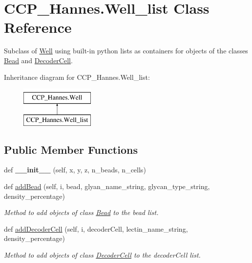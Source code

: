 \hypertarget{class_c_c_p___hannes_1_1_well__list}{}\section{C\+C\+P\+\_\+\+Hannes.\+Well\+\_\+list Class Reference}
\label{class_c_c_p___hannes_1_1_well__list}


Subclass of \mbox{\hyperlink{class_c_c_p___hannes_1_1_well}{Well}} using built-\/in python lists as containers for objects of the classes \mbox{\hyperlink{class_c_c_p___hannes_1_1_bead}{Bead}} and \mbox{\hyperlink{class_c_c_p___hannes_1_1_decoder_cell}{Decoder\+Cell}}.  


Inheritance diagram for C\+C\+P\+\_\+\+Hannes.\+Well\+\_\+list\+:\begin{figure}[H]
\begin{center}
\leavevmode
\includegraphics[height=2.000000cm]{class_c_c_p___hannes_1_1_well__list}
\end{center}
\end{figure}
\subsection*{Public Member Functions}
\begin{DoxyCompactItemize}
\item 
\mbox{\label{class_c_c_p___hannes_1_1_well__list_a933f4992003c4596f01e5d6eb073dd98}} 
def {\bfseries \+\_\+\+\_\+init\+\_\+\+\_\+} (self, x, y, z, n\+\_\+beads, n\+\_\+cells)
\item 
def \mbox{\hyperlink{class_c_c_p___hannes_1_1_well__list_ae4a512caba0dd7137b6ad4196cf72c1d}{add\+Bead}} (self, i, bead, glyan\+\_\+name\+\_\+string, glycan\+\_\+type\+\_\+string, density\+\_\+percentage)
\begin{DoxyCompactList}\small\item\em Method to add objects of class \mbox{\hyperlink{class_c_c_p___hannes_1_1_bead}{Bead}} to the bead list. \end{DoxyCompactList}\item 
def \mbox{\hyperlink{class_c_c_p___hannes_1_1_well__list_a761bc7b91f29dd64b96992fa33d24259}{add\+Decoder\+Cell}} (self, i, decoder\+Cell, lectin\+\_\+name\+\_\+string, density\+\_\+percentage)
\begin{DoxyCompactList}\small\item\em Method to add objects of class \mbox{\hyperlink{class_c_c_p___hannes_1_1_decoder_cell}{Decoder\+Cell}} to the decoder\+Cell list. \end{DoxyCompactList}\end{DoxyCompactItemize}
